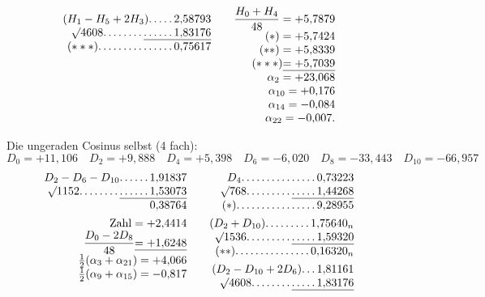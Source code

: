 \begin{landscape}
\[\begin{array}{@{}r@{\qquad}r@{\qquad}r@{}}
\begin{array}[t]{@{}r@{}}
(H_1-H_5+2H_3)\VfourDots{4}2{,}58793\\
\BareRoot{4608}\VfourDots{7}\underline{\VfourDots{5}1{,}83176}\\
(***)\VfourDots{14}0{,}75617
\end{array}
&\begin{array}[t]{@{}r@{}}
\dfrac{H_0+H_4}{48}=+5{,}7879\\
(*)=+5{,}7424\\
(**)=+5{,}8339\\
(***)\underline{=+5{,}7039}\\
\alpha_2=+23{,}068\\
\alpha_{10}=+0{,}176\\
\alpha_{14}=-0{,}084\\
\alpha_{22}=-0{,}007.
\end{array}
\end{array}
\]
\par\noindent\hspace*{\parindent}Die ungeraden Cosinus selbst (4 fach):
\[D_0=+11{,}106\quad D_2=+9{,}888\quad D_4=+5{,}398\quad D_6=-6{,}020\quad D_8=-33{,}443\quad D_{10}=-66{,}957\]
\clearpage{}
\[
\begin{array}{@{}r@{\qquad}r@{\qquad}r@{}}
\begin{array}[t]{@{}r@{}}
D_2-D_6-D_{10}\VfourDots{5}1{,}91837\\
\BareRoot{1152}\VfourDots{7}\underline{\VfourDots{5}1{,}53073}\\
0{,}38764\\[4pt]
\text{Zahl}=+2{,}4414\\
\dfrac{D_0-2D_8}{48}\underline{=+1{,}6248}\\
\tfrac12(\alpha_3+\alpha_{21})=+4{,}066\\
\tfrac12(\alpha_9+\alpha_{15})=-0{,}817
\end{array}
&\begin{array}[t]{@{}r@{}}
D_4\VfourDots{14}0{,}73223\\
\BareRoot{768}\VfourDots{8}\underline{\VfourDots{4}1{,}44268}\\
(*)\VfourDots{15}9{,}28955\\[4pt]
(D_2+D_{10})\VfourDots{8}1{,}75640_n\\
\BareRoot{1536}\VfourDots{8}\underline{\VfourDots{4}1{,}59320}\\
(**)\VfourDots{14}0{,}16320_n\\[4pt]
(D_2-D_{10}+2D_6)\VfourDots{2}1{,}81161\\
\BareRoot{4608}\VfourDots{7}\underline{\VfourDots{4}1{,}83176}\\

\end{array}
\end{array}\]
\end{landscape}
